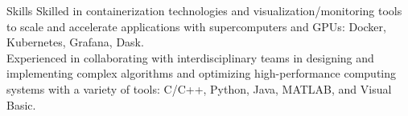 \documentclass{resume} %
\begin{document}

\begin{rSection}{Skills}
Skilled in containerization technologies and visualization/monitoring tools to scale and accelerate applications with supercomputers and GPUs: Docker, Kubernetes, Grafana, Dask.\\
Experienced in collaborating with interdisciplinary teams in designing and implementing complex algorithms and optimizing high-performance computing systems with a variety of tools: C/C++, Python, Java, MATLAB, and Visual Basic.
\end{rSection}

\end{document}
